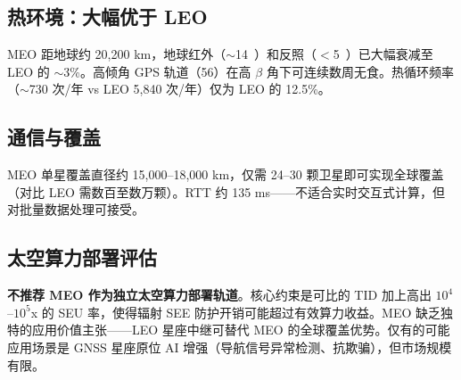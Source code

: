 \subsection{热环境：大幅优于 LEO}

MEO 距地球约 20,200 km，地球红外（$\sim$14~\wpm）和反照（$<$5~\wpm）已大幅衰减至 LEO 的 $\sim$3\%。高倾角 GPS 轨道（56\textdegree{}）在高 $\beta$ 角下可连续数周无食。热循环频率（$\sim$730 次/年 vs LEO 5,840 次/年）仅为 LEO 的 12.5\%。

\subsection{通信与覆盖}

MEO 单星覆盖直径约 15,000--18,000 km，仅需 24--30 颗卫星即可实现全球覆盖（对比 LEO 需数百至数万颗）。RTT 约 135 ms——不适合实时交互式计算，但对批量数据处理可接受。

\subsection{太空算力部署评估}

\textbf{不推荐 MEO 作为独立太空算力部署轨道}。核心约束是可比的 TID 加上高出 $10^{4}$--$10^{5}$x 的 SEU 率，使得辐射 SEE 防护开销可能超过有效算力收益。MEO 缺乏独特的应用价值主张——LEO 星座中继可替代 MEO 的全球覆盖优势。仅有的可能应用场景是 GNSS 星座原位 AI 增强（导航信号异常检测、抗欺骗），但市场规模有限。
